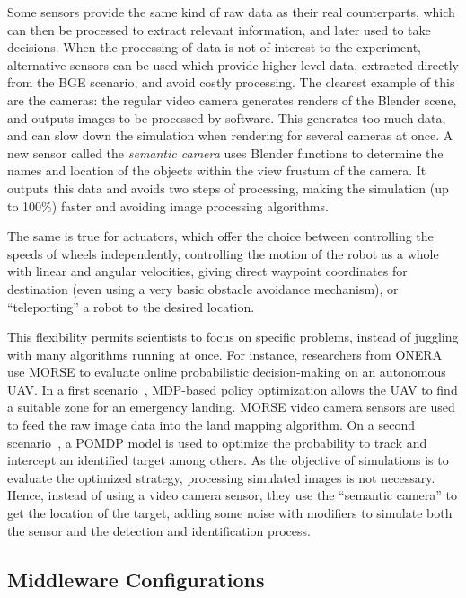 \documentclass{llncs}
\begin{document}
Some sensors provide the same kind of raw data as their real counterparts,
which can then be processed to extract relevant information,
and later used to take decisions. When the processing of data is not of
interest to the experiment, alternative sensors can be used which provide
higher level data, extracted directly from the BGE scenario, and avoid costly
processing.
The clearest example of this are the cameras: the regular video camera
generates renders of the Blender scene, and outputs images to be processed by
software. This generates too much data, and can slow down the simulation when
rendering for several cameras at once. A new sensor called the \emph{semantic
camera} uses Blender functions to determine the names and location of the
objects within the view frustum of the camera. It outputs this data and avoids
two steps of processing, making the simulation (up to 100\%) faster and
avoiding image processing algorithms.

The same is true for actuators, which offer the choice between controlling the
speeds of wheels independently, controlling the motion of the robot as a whole
with linear and angular velocities, giving direct waypoint coordinates for
destination (even using a very basic obstacle avoidance mechanism), or
``teleporting'' a robot to the desired location.

This flexibility permits scientists to focus on specific problems, instead of
juggling with many algorithms running at once.
For instance, researchers from ONERA use MORSE to evaluate online probabilistic
decision-making on an autonomous UAV. In a first scenario~\cite{teichteil2011},
MDP-based policy optimization allows the UAV to find a suitable zone for an
emergency landing. MORSE video camera sensors are used to feed the raw image data
into the land mapping algorithm.
On a second scenario~\cite{carvalho2012}, a POMDP model is used to optimize the
probability to track and intercept an identified target among others. As the
objective of simulations is to evaluate the optimized strategy, processing
simulated images is not necessary. Hence, instead of using a video camera
sensor, they use the ``semantic camera'' to get the location of the target,
adding some noise with modifiers to simulate both the sensor and the detection
and identification process.


\subsection {Middleware Configurations}
\label{section:middlewares}
\end{document}
